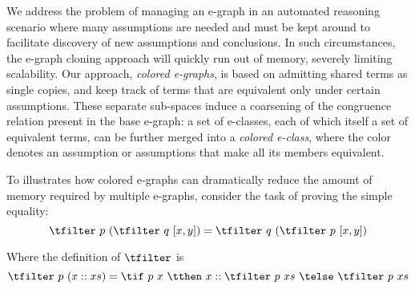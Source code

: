 \begin{comment}
In this work we focus on the proof-search use case, where a prover may have many proof goals (typically, sequents $\varphi\vdash\psi$) floating around---these are candidates for ``growing'' a proof tree that is being constructed gradually.
To be able to cope with this setting, we extend e-graphs with the capability to hold various assumptions simultaneously.
Normally, in an e-graph, assumptions added to it propagate throughout the graph, making it impossible to tell which equality is a consequence of which assumption.
A straightforward solution would be to create a separate copy of the graph for every assumption $\varphi$ (or set of such assumptions).
Clearly, this approach can become extremely costly in a proof-search setting where the bag of candidates held by the prover contains many different assumptions. [refer to Vampire and others].    
\end{comment}

We address the problem of managing an e-graph in an automated reasoning scenario where many assumptions are needed and must be kept around to facilitate discovery of new assumptions and conclusions.
In such circumstances, the e-graph cloning approach will quickly run out of memory,
severely limiting scalability.
Our approach, \emph{colored e-graphs}, is based on admitting shared terms as single copies,
and keep track of terms that are equivalent only under certain assumptions.
These separate sub-spaces induce a coarsening of the congruence relation present in the base e-graph:
a set of e-classes, each of which itself a set of equivalent terms, can be further merged into a
\emph{colored e-class}, where the color denotes an assumption or assumptions that make all its members equivalent.

To illustrates how colored e-graphs can dramatically reduce the amount of memory required by multiple e-graphs,
consider the task of proving the simple equality:
\[\tfilter~p~(\tfilter~q~[x,y]) =
  \tfilter~q~(\tfilter~p~[x,y])\]

Where the definition of $\tfilter$ is
\[\tfilter~p~(x::xs) = 
\tif~p~x~\tthen~x::\tfilter~p~xs 
~\telse~\tfilter~p~xs\]

